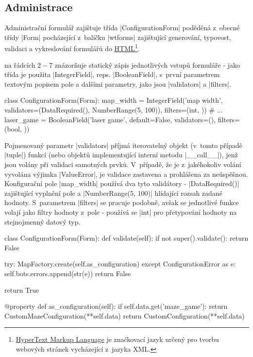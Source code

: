 \subsection{Administrace}
\label{subsec:administration}

Administrační formulář zajištuje třída \ic|ConfigurationForm| poděděná z~obecné třídy \ic|Form| pocházející z~balíčku \ic|wtforms| zajištující generování, typovost, validaci a vykreslování formulářů do \href{https://cs.wikipedia.org/wiki/HyperText_Markup_Language}{HTML}\footnote{\href{https://cs.wikipedia.org/wiki/HyperText_Markup_Language}{HyperText Markup Language} je značkovací jazyk určený pro tvorbu webových stránek vycházející z~jazyka XML.}.

 na řádcích $2-7$ znázorňuje statický zápis jednotlivých vstupů formuláře - jako třída je použita \ic|IntegerField|, reps. \ic|BooleanField|, s~první parametrem textovým popisem pole a dalšími parametry, jako jsou \ic|validators| a \ic|filters|.

\begin{code}[caption={Ukázka deklarace polí konfiguračního formuláře},label={lst:conf-form-fields}]
class ConfigurationForm(Form):
    map_width = IntegerField('map width',
        validators=(DataRequired(), NumberRange(5, 100)),
        filters=(int, ))
    # ...
    laser_game = BooleanField('laser game',
        default=False, validators=(),
        filters=(bool, ))
\end{code}

Pojmenovaný parametr \ic|validators| příjmá iterovatelný objekt (v~tomto případě \ic|tuple|) funkcí (nebo objektů implementující interní metodu \ic|__call__|), jenž jsou volány při validaci samotných prvků. V~případě, že je z~jakéhokoliv volání vyvolána výjimka \ic|ValueError|, je validace zastavena a prohlášena za neúspěšnou. Konfigurační pole \ic|map_width| používá dva tyto validátory - \ic|DataRequired()| zajištující vyplnění pole a \ic|NumberRange(5, 100)| hlídající rozsah zadané hodnoty. S~parametrem \ic|filters| se pracuje podobně, avšak se jednotlivé funkce volají jako filtry hodnoty z~pole - používá se \ic|int| pro přetypování hodnoty na stejnojmenný datový typ.

\begin{code}[caption={Implementace vlastních metod v~$ConfigurationForm$},label={lst:conf-form-methods}]
class ConfigurationForm(Form):
    def validate(self):
        if not super().validate():
            return False

        try:
            MapFactory.create(self.as_configuration)
        except ConfigurationError as e:
            self.bots.errors.append(str(e))
            return False

        return True

    @property
    def as_configuration(self):
        if self.data.get('maze_game'):
            return CustomMazeConfiguration(**self.data)
        return CustomConfiguration(**self.data)
\end{code}

